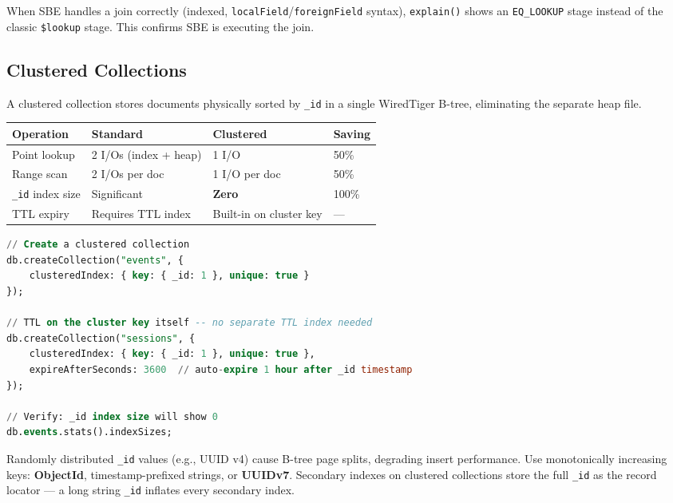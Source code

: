 \documentclass[12pt,a4paper]{article}
\begin{document}
\begin{infobox}
When SBE handles a join correctly (indexed, \texttt{localField}/\texttt{foreignField} syntax), \texttt{explain()} shows an \texttt{EQ\_LOOKUP} stage instead of the classic \texttt{\$lookup} stage. This confirms SBE is executing the join.
\end{infobox}

\subsection{Clustered Collections}

A clustered collection stores documents physically sorted by \texttt{\_id} in a single WiredTiger B-tree, eliminating the separate heap file.

\begin{center}
\begin{tabular}{llll}
\toprule
\textbf{Operation} & \textbf{Standard} & \textbf{Clustered} & \textbf{Saving} \\
\midrule
Point lookup & 2 I/Os (index + heap) & 1 I/O & 50\% \\
Range scan & 2 I/Os per doc & 1 I/O per doc & 50\% \\
\texttt{\_id} index size & Significant & \textbf{Zero} & 100\% \\
TTL expiry & Requires TTL index & Built-in on cluster key & --- \\
\bottomrule
\end{tabular}
\end{center}

\begin{lstlisting}[language=SQL, caption={Creating clustered collections}]
// Create a clustered collection
db.createCollection("events", {
    clusteredIndex: { key: { _id: 1 }, unique: true }
});

// TTL on the cluster key itself -- no separate TTL index needed
db.createCollection("sessions", {
    clusteredIndex: { key: { _id: 1 }, unique: true },
    expireAfterSeconds: 3600  // auto-expire 1 hour after _id timestamp
});

// Verify: _id index size will show 0
db.events.stats().indexSizes;
\end{lstlisting}

\begin{warnbox}
Randomly distributed \texttt{\_id} values (e.g., UUID v4) cause B-tree page splits, degrading insert performance. Use monotonically increasing keys: \textbf{ObjectId}, timestamp-prefixed strings, or \textbf{UUIDv7}. Secondary indexes on clustered collections store the full \texttt{\_id} as the record locator --- a long string \texttt{\_id} inflates every secondary index.
\end{warnbox}
\end{document}
